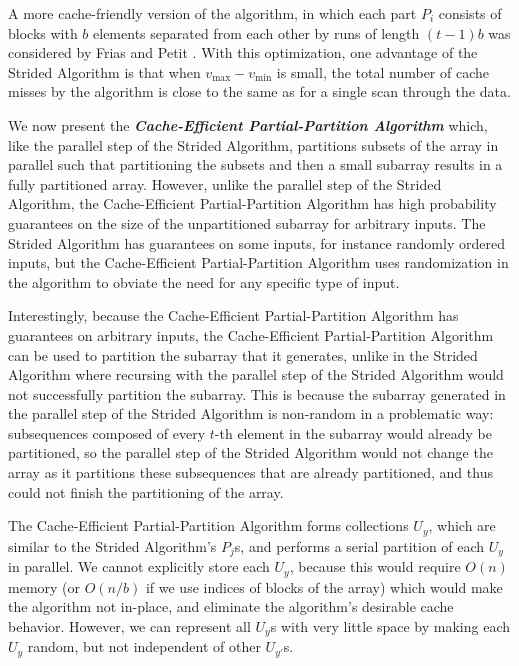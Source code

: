 \documentclass[sigconf]{acmart}
\newcommand{\defn}[1]       {{\textit{\textbf{\boldmath #1}}}}
\renewcommand{\paragraph}[1]{\vspace{0.09in}\noindent{\bf \boldmath #1.}}
\theoremstyle{remark}
\theoremstyle{remark}
\begin{document}
A more cache-friendly version of the algorithm, in which each part $P_i$ consists of blocks with $b$ elements separated from each other by runs of length $(t - 1) b$ was considered by Frias and Petit \cite{Frias08}.
With this optimization, one advantage of the Strided Algorithm is that when $v_{\text{max}} - v_{\text{min}}$ is small, the total number of cache misses by the algorithm is close to the same as for a single scan through the data. 

\paragraph{Algorithm Concept}
We now present the \defn{Cache-Efficient Partial-Partition Algorithm} which, like the parallel step of the Strided Algorithm, partitions subsets of the array in parallel such that partitioning the subsets and then a small subarray results in a fully partitioned array. 
However, unlike the parallel step of the Strided Algorithm, the Cache-Efficient Partial-Partition Algorithm has high probability guarantees on the size of the unpartitioned subarray for arbitrary inputs. 
The Strided Algorithm has guarantees on some inputs, for instance randomly ordered inputs, but the Cache-Efficient Partial-Partition Algorithm uses randomization in the algorithm to obviate the need for any specific type of input. 

Interestingly, because the Cache-Efficient Partial-Partition Algorithm has guarantees on arbitrary inputs, the Cache-Efficient Partial-Partition Algorithm can be used to partition the subarray that it generates, unlike in the Strided Algorithm where recursing with the parallel step of the Strided Algorithm would not successfully partition the subarray.
This is because the subarray generated in the parallel step of the Strided Algorithm is non-random in a problematic way: subsequences composed of every $t$-th element in the subarray would already be partitioned, so the parallel step of the Strided Algorithm would not change the array as it partitions these subsequences that are already partitioned, and thus could not finish the partitioning of the array.

The Cache-Efficient Partial-Partition Algorithm forms collections $U_y$, which are similar to the Strided Algorithm's $P_j$s, and performs a serial partition of each $U_y$ in parallel.
We cannot explicitly store each $U_y$, because this would require $O(n)$ memory (or $O(n/b)$ if we use indices of blocks of the array) which would make the algorithm not in-place, and eliminate the algorithm's desirable cache behavior. 
However, we can represent all $U_y$s with very little space by making each $U_y$ random, but not independent of other $U_{y'}$s. 
\end{document}
